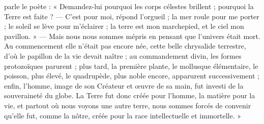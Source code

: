 \documentclass[a4paper, 11pt, oneside, landscape]{article}
\begin{document}
parle le poète : « Demandez-lui pourquoi les corps célestes brillent ; pourquoi la Terre est faite ? --- C'est pour moi, répond l'orgueil ; la mer roule pour me porter ; le soleil se lève pour m'éclairer ; la terre est mon marchepied, et le ciel mon pavillon. » --- Mais nous nous sommes mépris en pensant que l'univers était mort. Au commencement elle n'était pas encore née, cette belle chrysalide terrestre, d'où le papillon de la vie devait naître ; au commandement divin, les formes protozoïques parurent ; plus tard, la première plante, le mollusque élémentaire, le poisson, plus élevé, le quadrupède, plus noble encore, apparurent successivement ; enfin, l'homme, image de son Créateur et œuvre de sa main, fut investi de la souveraineté du globe. La Terre fut donc créée pour l'homme, la matière pour la vie, et partout où nous voyons une autre terre, nous sommes forcés de convenir qu'elle fut, comme la nôtre, créée pour la race intellectuelle et immortelle. »
\end{document}
